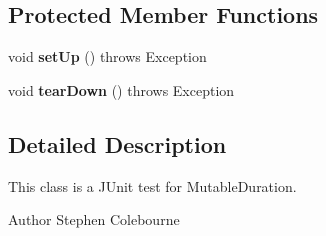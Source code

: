 \subsection*{Protected Member Functions}
\begin{DoxyCompactItemize}
\item 
\hypertarget{classorg_1_1joda_1_1time_1_1_test_mutable_period___constructors_a7cca82f917164982609f011edfc21578}{void {\bfseries set\-Up} ()  throws Exception }\label{classorg_1_1joda_1_1time_1_1_test_mutable_period___constructors_a7cca82f917164982609f011edfc21578}

\item 
\hypertarget{classorg_1_1joda_1_1time_1_1_test_mutable_period___constructors_ac0cc2001dfac59d5c6b180b0623f4622}{void {\bfseries tear\-Down} ()  throws Exception }\label{classorg_1_1joda_1_1time_1_1_test_mutable_period___constructors_ac0cc2001dfac59d5c6b180b0623f4622}

\end{DoxyCompactItemize}


\subsection{Detailed Description}
This class is a J\-Unit test for Mutable\-Duration.

\begin{DoxyAuthor}{Author}
Stephen Colebourne 
\end{DoxyAuthor}



